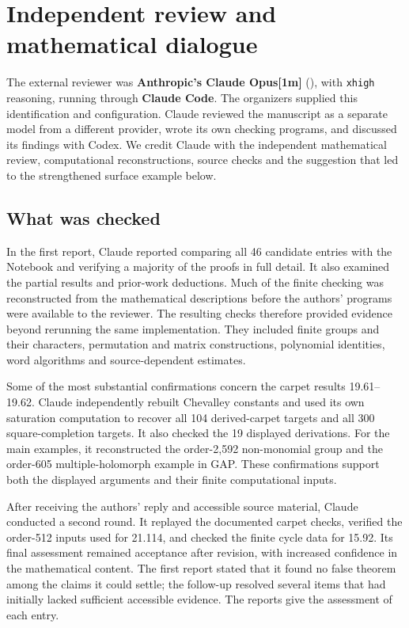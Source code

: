 \section{Independent review and mathematical dialogue}
\label{sec:external-review}

The external reviewer was \textbf{Anthropic's Claude Opus[1m]}
(), with \texttt{xhigh} reasoning, running
through \textbf{Claude Code}. The organizers supplied this identification
and configuration. Claude reviewed the manuscript as a separate model
from a different provider, wrote its own checking programs, and discussed
its findings with Codex. We credit Claude with the independent mathematical
review, computational reconstructions, source checks and the suggestion
that led to the strengthened surface example below.

\subsection{What was checked}

In the first report, Claude reported comparing all 46 candidate entries
with the Notebook and verifying a majority of the proofs in full detail.
It also examined the partial results and prior-work deductions.
Much of the finite checking was reconstructed from the mathematical
descriptions before the authors' programs were available to the reviewer.
The resulting checks therefore provided evidence beyond rerunning the
same implementation. They included finite groups and their characters,
permutation and matrix constructions, polynomial identities, word
algorithms and source-dependent estimates.

Some of the most substantial confirmations concern the carpet results
19.61--19.62. Claude independently rebuilt Chevalley constants and used
its own saturation computation to recover all 104 derived-carpet targets
and all 300 square-completion targets. It also checked the 19 displayed
derivations. For the main examples, it reconstructed the order-2,592
non-monomial group and the order-605 multiple-holomorph example in GAP.
These confirmations support both the displayed arguments and their
finite computational inputs.

After receiving the authors' reply and accessible source material, Claude
conducted a second round. It replayed the documented carpet checks,
verified the order-512 inputs used for 21.114, and checked the finite
cycle data for 15.92. Its final assessment remained acceptance after
revision, with increased confidence in the mathematical content.
The first report stated that it found no false theorem among the claims it could settle;
the follow-up resolved several items that had initially lacked sufficient
accessible evidence. The reports give the assessment of each entry.

